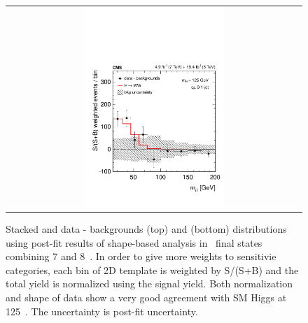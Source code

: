 \begin{figure}[htp]
\begin{tabular}{c}
\includegraphics[width=0.49\textwidth]{figures/dataminusbkg_mll_1dweight.pdf} 
\end{tabular} 
\caption{Stacked and data - backgrounds 
\mT(top) and \mll(bottom) distributions using post-fit results 
of shape-based analysis
in \DF\ final states combining 7 and 8~\TeV.
In order to give more weights to sensitivie categories, each bin of 2D 
template is weighted by S/(S+B) and the total yield is normalized using the signal yield. 
Both normalization and shape of data show a very good agreement with SM Higgs at 125~\GeV.
The uncertainty is post-fit uncertainty.} 
\label{fig:post1Dprojection_1dweight} 
\end{figure} 


